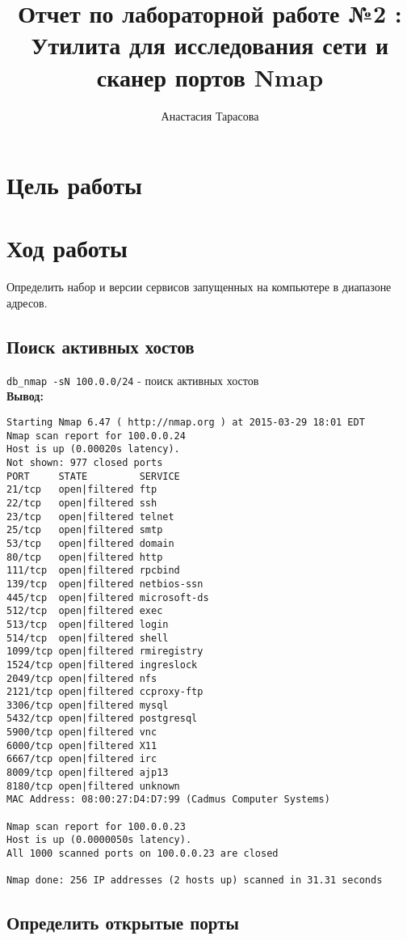\documentclass[12pt,a4paper]{article}
\author{Анастасия Тарасова}
\title{Отчет по лабораторной работе №2 :\\ Утилита для исследования сети и сканер
портов Nmap}
\begin{document}
\maketitle
\section{Цель работы}

\section{Ход работы}
Определить набор и версии сервисов запущенных на компьютере в диапазоне адресов.
\newpage
\subsection{Поиск активных хостов}



\verb+db_nmap -sN 100.0.0/24+ - поиск активных хостов\\

\textbf{Вывод:}

\begin{lstlisting}
Starting Nmap 6.47 ( http://nmap.org ) at 2015-03-29 18:01 EDT
Nmap scan report for 100.0.0.24
Host is up (0.00020s latency).
Not shown: 977 closed ports
PORT     STATE         SERVICE
21/tcp   open|filtered ftp
22/tcp   open|filtered ssh
23/tcp   open|filtered telnet
25/tcp   open|filtered smtp
53/tcp   open|filtered domain
80/tcp   open|filtered http
111/tcp  open|filtered rpcbind
139/tcp  open|filtered netbios-ssn
445/tcp  open|filtered microsoft-ds
512/tcp  open|filtered exec
513/tcp  open|filtered login
514/tcp  open|filtered shell
1099/tcp open|filtered rmiregistry
1524/tcp open|filtered ingreslock
2049/tcp open|filtered nfs
2121/tcp open|filtered ccproxy-ftp
3306/tcp open|filtered mysql
5432/tcp open|filtered postgresql
5900/tcp open|filtered vnc
6000/tcp open|filtered X11
6667/tcp open|filtered irc
8009/tcp open|filtered ajp13
8180/tcp open|filtered unknown
MAC Address: 08:00:27:D4:D7:99 (Cadmus Computer Systems)

Nmap scan report for 100.0.0.23
Host is up (0.0000050s latency).
All 1000 scanned ports on 100.0.0.23 are closed

Nmap done: 256 IP addresses (2 hosts up) scanned in 31.31 seconds

\end{lstlisting}
\newpage
\subsection{Определить открытые порты}
\end{document}
